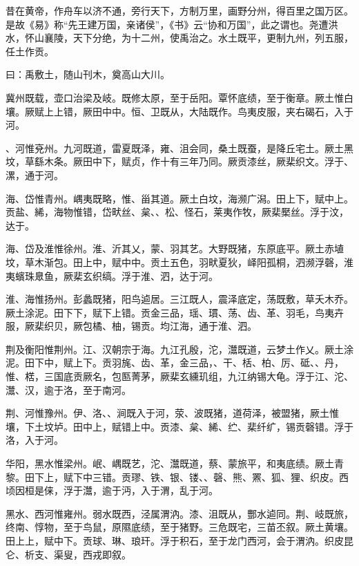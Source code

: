 \documentclass[12pt,UTF8]{ctexbook}
\begin{document}
昔在黄帝，作舟车以济不通，旁行天下，方制万里，画野分州，得百里之国万区。是故《易》称“先王建万国，亲诸侯”，《书》云“协和万国”，此之谓也。尧遭洪水，怀山襄陵，天下分绝，为十二州，使禹治之。水土既平，更制九州，列五服，任土作贡。



曰：禹敷土，随山刊木，奠高山大川。



冀州既载，壶口治梁及岐。既修太原，至于岳阳。覃怀底绩，至于衡章。厥土惟白壤。厥赋上上错，厥田中中。恒、卫既从，大陆既作。鸟夷皮服，夹右碣石，入于河。



、河惟兗州。九河既道，雷夏既泽，雍、沮会同，桑土既蚕，是降丘宅土。厥土黑坟，草繇木条。厥田中下，赋贞，作十有三年乃同。厥贡漆丝，厥棐织文。浮于、漯，通于河。



海、岱惟青州。嵎夷既略，惟、甾其道。厥土白坟，海濒广潟。田上下，赋中上。贡盐、絺，海物惟错，岱畎丝、枲、、松、怪石，莱夷作牧，厥棐檿丝。浮于汶，达于。



海、岱及淮惟徐州。淮、沂其乂，蒙、羽其艺。大野既猪，东原底平。厥土赤埴坟，草木渐包。田上中，赋中中。贡土五色，羽畎夏狄，峄阳孤桐，泗濒浮磬，淮夷蠙珠臮鱼，厥棐玄织缟。浮于淮、泗，达于河。



淮、海惟扬州。彭蠡既猪，阳鸟逌居。三江既人，震泽底定，荡既敷，草夭木乔。厥土涂泥。田下下，赋下上错。贡金三品，瑶、瑻、荡、齿、革、羽毛，鸟夷卉服，厥棐织贝，厥包橘、柚，锡贡。均江海，通于淮、泗。



荆及衡阳惟荆州。江、汉朝宗于海。九江孔殷，沱，灊既道，云梦土作乂。厥土涂泥。田下中，赋上下。贡羽旄、齿、革，金三品，、干、栝、柏、厉、砥、、丹，惟、楛，三国底贡厥名，包匦菁茅，厥棐玄纁玑组，九江纳锡大龟。浮于江、沱、灊、汉，逾于洛，至于南河。



荆、河惟豫州。伊、洛、、涧既入于河，荥、波既猪，道荷泽，被盟猪，厥土惟壤，下土坟垆。田中上，赋错上中。贡漆、枲、絺、纻、棐纤纩，锡贡磬错。浮于洛，入于河。



华阳，黑水惟梁州。岷、嵎既艺，沱、灊既道，蔡、蒙旅平，和夷底绩。厥土青黎。田下上，赋下中三错。贡璆、铁、银、镂、、磬、熊、罴、狐、狸、织皮。西顷因桓是俫，浮于灊，逾于沔，入于渭，乱于河。



黑水、西河惟雍州。弱水既西，泾属渭汭。漆、沮既从，酆水逌同。荆、岐既旅，终南、惇物，至于鸟鼠，原隰底绩，至于猪野。三危既宅，三苗丕叙。厥土黄壤。田上上，赋中下。贡球、琳、琅玕。浮于积石，至于龙门西河，会于渭汭。织皮昆仑、析支、渠叟，西戎即叙。
\end{document}
